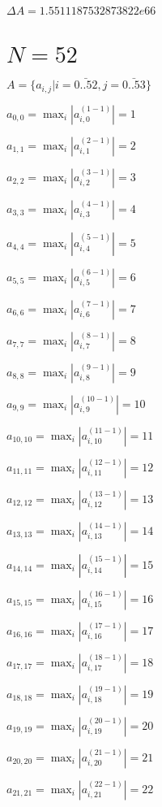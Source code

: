 \documentclass[a4paper,12pt]{article}
\begin{document}
$\Delta A = 1.5511187532873822e66$



\section{ $N = 52$ }
$A = \{ a _{ i, j } | i = \bar { 0..52 }, j = \bar { 0..53 } \}$

$a _{ 0, 0 } =  \max _i |a _{ i, 0 } ^{ (1 - 1) } | = 1$

$a _{ 1, 1 } =  \max _i |a _{ i, 1 } ^{ (2 - 1) } | = 2$

$a _{ 2, 2 } =  \max _i |a _{ i, 2 } ^{ (3 - 1) } | = 3$

$a _{ 3, 3 } =  \max _i |a _{ i, 3 } ^{ (4 - 1) } | = 4$

$a _{ 4, 4 } =  \max _i |a _{ i, 4 } ^{ (5 - 1) } | = 5$

$a _{ 5, 5 } =  \max _i |a _{ i, 5 } ^{ (6 - 1) } | = 6$

$a _{ 6, 6 } =  \max _i |a _{ i, 6 } ^{ (7 - 1) } | = 7$

$a _{ 7, 7 } =  \max _i |a _{ i, 7 } ^{ (8 - 1) } | = 8$

$a _{ 8, 8 } =  \max _i |a _{ i, 8 } ^{ (9 - 1) } | = 9$

$a _{ 9, 9 } =  \max _i |a _{ i, 9 } ^{ (10 - 1) } | = 10$

$a _{ 10, 10 } =  \max _i |a _{ i, 10 } ^{ (11 - 1) } | = 11$

$a _{ 11, 11 } =  \max _i |a _{ i, 11 } ^{ (12 - 1) } | = 12$

$a _{ 12, 12 } =  \max _i |a _{ i, 12 } ^{ (13 - 1) } | = 13$

$a _{ 13, 13 } =  \max _i |a _{ i, 13 } ^{ (14 - 1) } | = 14$

$a _{ 14, 14 } =  \max _i |a _{ i, 14 } ^{ (15 - 1) } | = 15$

$a _{ 15, 15 } =  \max _i |a _{ i, 15 } ^{ (16 - 1) } | = 16$

$a _{ 16, 16 } =  \max _i |a _{ i, 16 } ^{ (17 - 1) } | = 17$

$a _{ 17, 17 } =  \max _i |a _{ i, 17 } ^{ (18 - 1) } | = 18$

$a _{ 18, 18 } =  \max _i |a _{ i, 18 } ^{ (19 - 1) } | = 19$

$a _{ 19, 19 } =  \max _i |a _{ i, 19 } ^{ (20 - 1) } | = 20$

$a _{ 20, 20 } =  \max _i |a _{ i, 20 } ^{ (21 - 1) } | = 21$

$a _{ 21, 21 } =  \max _i |a _{ i, 21 } ^{ (22 - 1) } | = 22$
\end{document}

